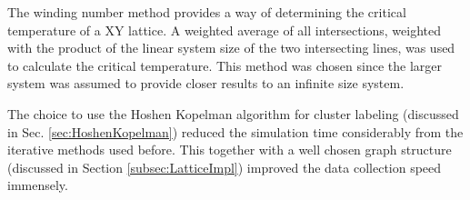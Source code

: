 The winding number method provides a way of determining the critical temperature of a XY lattice. A weighted average of all intersections, weighted with the product of the linear system size of the two intersecting lines, was used to calculate the critical temperature. This method was chosen since the larger system was assumed to provide closer results to an infinite size system.

The choice to use the Hoshen Kopelman algorithm for cluster labeling (discussed in Sec. \ref{sec:HoshenKopelman}) reduced the simulation time considerably from the iterative methods used before. This together with a well chosen graph structure (discussed in Section \ref{subsec:LatticeImpl}) improved the data collection speed immensely.





